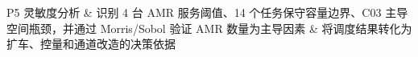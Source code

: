 P5 灵敏度分析 & 识别 4 台 AMR 服务阈值、14 个任务保守容量边界、C03 主导空间瓶颈，并通过 Morris/Sobol 验证 AMR 数量为主导因素 & 将调度结果转化为扩车、控量和通道改造的决策依据
